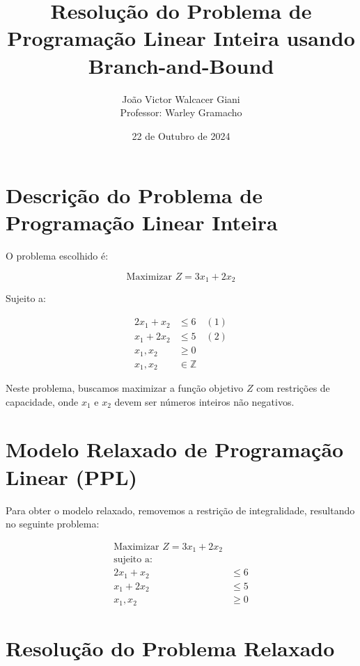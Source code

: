 \documentclass{article}
\begin{document}
\title{Resolução do Problema de Programação Linear Inteira usando Branch-and-Bound}
\author{João Victor Walcacer Giani\\ Professor: Warley Gramacho}
\date{22 de Outubro de 2024}
\maketitle

\section{Descrição do Problema de Programação Linear Inteira}

O problema escolhido é:

\begin{equation}
\text{Maximizar } Z = 3x_1 + 2x_2
\end{equation}

Sujeito a:

\begin{align}
2x_1 + x_2 & \leq 6 \quad (1) \\
x_1 + 2x_2 & \leq 5 \quad (2) \\
x_1, x_2 & \geq 0 \quad  \\
x_1, x_2 & \in \mathbb{Z} \quad 
\end{align}

Neste problema, buscamos maximizar a função objetivo \(Z\) com restrições de capacidade, onde \(x_1\) e \(x_2\) devem ser números inteiros não negativos.

\section{Modelo Relaxado de Programação Linear (PPL)}

Para obter o modelo relaxado, removemos a restrição de integralidade, resultando no seguinte problema:

\begin{align}
\text{Maximizar } Z = 3x_1 + 2x_2 \\
\text{sujeito a:} \\
2x_1 + x_2 & \leq 6 \\
x_1 + 2x_2 & \leq 5 \\
x_1, x_2 & \geq 0
\end{align}

\section{Resolução do Problema Relaxado}
\end{document}
